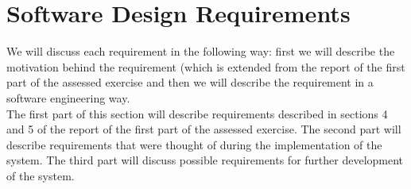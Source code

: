 \documentclass[a4paper]{article}
\begin{document}
\section{Software Design Requirements}
We will discuss each requirement in the following way: first we will describe the motivation behind the requirement (which is extended from the report of the first part of the assessed exercise and then we will describe the requirement in a software engineering way.\\
The first part of this section will describe requirements described in sections 4 and 5 of the report of the first part of the assessed exercise. The second part will describe requirements that were thought of during the implementation of the system. The third part will discuss possible requirements for further development of the system.
\begin{itemize}

\end{itemize}
\end{document}
